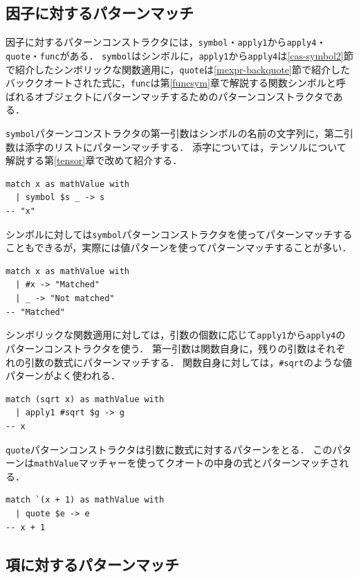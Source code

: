 \subsection{因子に対するパターンマッチ}

因子に対するパターンコンストラクタには，\lstinline{symbol}・\lstinline{apply1}から\lstinline{apply4}・\lstinline{quote}・\lstinline{func}がある．
\lstinline{symbol}はシンボルに，\lstinline{apply1}から\lstinline{apply4}は\ref{cas-symbol2}節で紹介したシンボリックな関数適用に，\lstinline{quote}は\ref{mexpr-backquote}節で紹介したバッククオートされた式に，\lstinline{func}は第\ref{funcsym}章で解説する関数シンボルと呼ばれるオブジェクトにパターンマッチするためのパターンコンストラクタである．

\lstinline{symbol}パターンコンストラクタの第一引数はシンボルの名前の文字列に，第二引数は添字のリストにパターンマッチする．
添字については，テンソルについて解説する第\ref{tensor}章で改めて紹介する．
\begin{lstlisting}[language=egison,numbers=none]
match x as mathValue with
  | symbol $s _ -> s
-- "x"
\end{lstlisting}
シンボルに対しては\lstinline{symbol}パターンコンストラクタを使ってパターンマッチすることもできるが，実際には値パターンを使ってパターンマッチすることが多い．
\begin{lstlisting}[language=egison,numbers=none]
match x as mathValue with
  | #x -> "Matched"
  | _ -> "Not matched"
-- "Matched"
\end{lstlisting}

シンボリックな関数適用に対しては，引数の個数に応じて\lstinline{apply1}から\lstinline{apply4}のパターンコンストラクタを使う．
第一引数は関数自身に，残りの引数はそれぞれの引数の数式にパターンマッチする．
関数自身に対しては，\lstinline{#sqrt}のような値パターンがよく使われる．
\begin{lstlisting}[language=egison,numbers=none]
match (sqrt x) as mathValue with
  | apply1 #sqrt $g -> g
-- x
\end{lstlisting}

\lstinline{quote}パターンコンストラクタは引数に数式に対するパターンをとる．
このパターンは\lstinline{mathValue}マッチャーを使ってクオートの中身の式とパターンマッチされる．
\begin{lstlisting}[language=egison,numbers=none,escapechar=']
match `(x + 1) as mathValue with
  | quote $e -> e
-- x + 1
\end{lstlisting}


\subsection{項に対するパターンマッチ}

